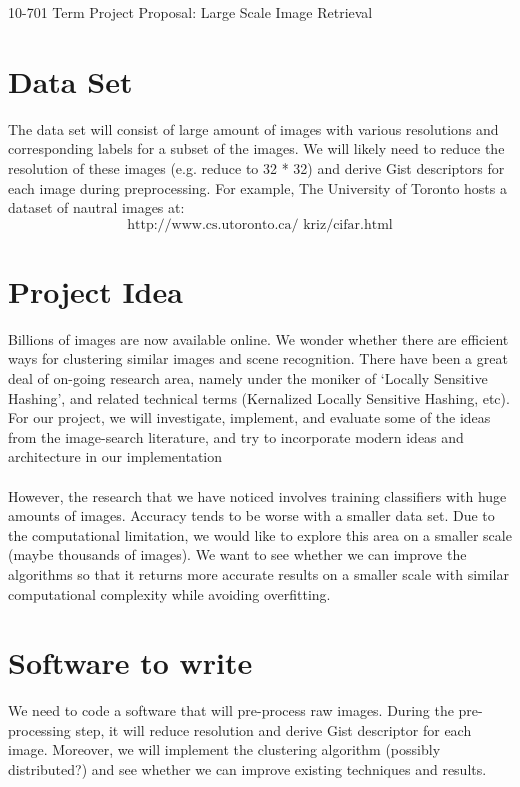 \documentclass[11pt]{article}
\begin{document}
\medskip                        

\thispagestyle{plain}
\begin{center}                  %
{\Large 10-701 Term Project Proposal: Large Scale Image Retrieval}
\end{center}

\section*{Data Set}
The data set will consist of large amount of images with various resolutions and corresponding 
labels for a subset of the images. We will likely need to reduce the resolution of these images 
(e.g. reduce to 32 * 32) and derive Gist descriptors for each image during preprocessing. For example,
The University of Toronto hosts a dataset of nautral images at:
\[
\text{http://www.cs.utoronto.ca/~kriz/cifar.html}
\]

\section*{Project Idea}
Billions of images are now available online. We wonder whether there are efficient ways for clustering
similar images and scene recognition. There have been a great deal of on-going research area, namely under
the moniker of `Locally Sensitive Hashing', and related technical terms (Kernalized Locally Sensitive Hashing, etc).
For our project, we will investigate, implement, and evaluate some of the ideas from the image-search literature,
and try to incorporate modern ideas and architecture in our implementation\\
\\
However, the research that we have noticed involves training classifiers with huge amounts of images. Accuracy 
tends to be worse with a smaller data set. Due to the computational limitation, we would like to explore this
area on a smaller scale (maybe thousands of images). We want to see whether we can improve the algorithms so 
that it returns more accurate results on a smaller scale with similar computational complexity while avoiding
overfitting.

\section*{Software to write}
We need to code a software that will pre-process raw images. During the pre-processing step, it will reduce 
resolution and derive Gist descriptor for each image. Moreover, we will implement the clustering algorithm 
(possibly distributed?) and see whether we can improve existing techniques and results. 
\end{document}
